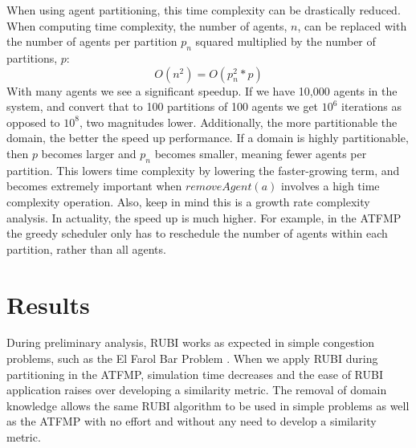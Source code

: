 \documentclass[letterpaper]{article}
\begin{document}
When using agent partitioning, this time complexity can be drastically reduced. When computing time complexity, the number of agents, $n$, can be replaced with the number of agents per partition $p_n$ squared multiplied by the number of partitions, $p$:
%
\begin{equation}
O(n^2) = O(p_n^2 * p)
\end{equation}
%
With many agents we see a significant speedup. If we have 10,000 agents in the system, and convert that to 100 partitions of 100 agents we get $10^6$ iterations as opposed to $10^8$, two magnitudes lower. Additionally, the more partitionable the domain, the better the speed up performance. If a domain is highly partitionable, then $p$ becomes larger and $p_n$ becomes smaller, meaning fewer agents per partition. This lowers time complexity by lowering the faster-growing term, and becomes extremely important when $removeAgent(a)$ involves a high time complexity operation. Also, keep in mind this is a growth rate complexity analysis. In actuality, the speed up is much higher. For example, in the ATFMP the greedy scheduler only has to reschedule the number of agents within each partition, rather than all agents.


\section{Results}

During preliminary analysis, RUBI works as expected in simple congestion problems, such as the El Farol Bar Problem \cite{BarProblem}. When we apply RUBI during partitioning in the ATFMP, simulation time decreases and the ease of RUBI application raises over developing a similarity metric. The removal of domain knowledge allows the same RUBI algorithm to be used in simple problems as well as the ATFMP with no effort and without any need to develop a similarity metric.
\end{document}
